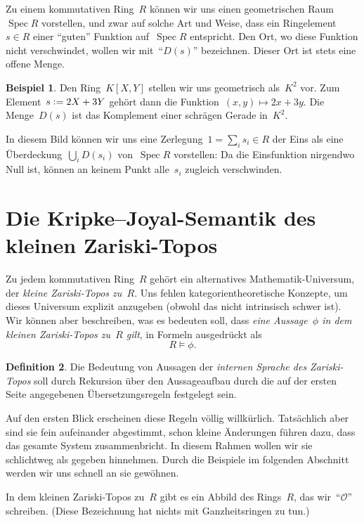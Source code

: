 \documentclass[a4paper,ngerman,12pt]{scrartcl}
\theoremstyle{definition}
\newtheorem{defn}{Definition}[section]
\newtheorem{bsp}[defn]{Beispiel}
\theoremstyle{plain}
\theoremstyle{remark}
\renewcommand{\O}{\mathcal{O}}
\DeclareMathOperator{\Spec}{Spec}
\renewcommand{\_}{\mathpunct{.}\,}
\newcommand{\?}{\,{:}\,}
\newcommand{\defeq}{\vcentcolon=}
\begin{document}
Zu einem kommutativen Ring~$R$ können wir uns einen geometrischen Raum~$\Spec
R$ vorstellen, und zwar auf solche Art und Weise, dass ein
Ringelement~$s \in R$ einer "`guten"' Funktion auf~$\Spec R$ entspricht.
Den Ort, wo diese Funktion nicht verschwindet, wollen wir mit~"`$D(s)$"'
bezeichnen. Dieser Ort ist stets eine offene Menge.

\begin{bsp}Den Ring~$K[X,Y]$ stellen wir uns geometrisch als~$K^2$ vor. Zum
Element~$s \defeq 2X+3Y$ gehört dann die Funktion~$(x,y) \mapsto 2x+3y$. Die
Menge~$D(s)$ ist das Komplement einer schrägen Gerade in~$K^2$.\end{bsp}

In diesem Bild können wir uns eine Zerlegung~$1 = \sum_i s_i \in R$ der Eins
als eine Über\-de\-ckung~$\bigcup_i D(s_i)$ von~$\Spec R$ vorstellen: Da die
Einsfunktion nirgendwo Null ist, können an keinem Punkt alle~$s_i$ zugleich
verschwinden.


\section{Die Kripke--Joyal-Semantik des kleinen Zariski-Topos}

Zu jedem kommutativen Ring~$R$ gehört ein alternatives Mathematik-Universum,
der \emph{kleine Zariski-Topos zu~$R$}. Uns fehlen kategorientheoretische
Konzepte, um dieses Universum explizit anzugeben (obwohl das nicht intrinsisch
schwer ist). Wir können aber beschreiben, was es bedeuten soll, dass \emph{eine
Aussage~$\phi$ in dem kleinen Zariski-Topos zu~$R$ gilt}, in Formeln
ausgedrückt als
\[ R \models \phi. \]

\begin{defn}Die Bedeutung von Aussagen der \emph{internen Sprache des
Zariski-Topos} soll durch Rekursion über den Aussageaufbau durch die auf der
ersten Seite angegebenen Übersetzungsregeln festgelegt sein.\end{defn}

Auf den ersten Blick erscheinen diese Regeln völlig
willkürlich. Tatsächlich aber sind sie fein aufeinander abgestimmt, schon
kleine Änderungen führen dazu, dass das gesamte System zusammenbricht. In
diesem Rahmen wollen wir sie schlichtweg als gegeben hinnehmen. Durch die
Beispiele im folgenden Abschnitt werden wir uns schnell an sie gewöhnen.

In dem kleinen Zariski-Topos zu~$R$ gibt es ein Abbild des Rings~$R$, das
wir~"`$\O$"' schreiben. (Diese Bezeichnung hat nichts mit Ganzheitsringen zu tun.)
\end{document}
